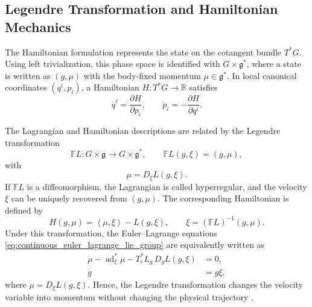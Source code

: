 \subsection{Legendre Transformation and Hamiltonian Mechanics}
\label{sec:continuous_legendre_hamiltonian_mechanics}

The Hamiltonian formulation represents the state on the cotangent bundle $T^*G$. Using left trivialization, this phase space is identified with $G\times\mathfrak g^*$, where a state is written as $(g,\mu)$ with the body-fixed momentum $\mu\in\mathfrak g^*$. In local canonical coordinates $(q^i,p_i)$, a Hamiltonian $H:T^*G\rightarrow\mathbb R$ satisfies
\begin{equation}
    \dot q^i=\frac{\partial H}{\partial p_i},
    \qquad
    \dot p_i=-\frac{\partial H}{\partial q^i}.
    \label{eq:canonical_hamilton_equations}
\end{equation}

The Lagrangian and Hamiltonian descriptions are related by the Legendre transformation
\begin{equation}
    \mathbb{F}L:G\times\mathfrak g\rightarrow G\times\mathfrak g^*,
    \qquad
    \mathbb{F}L(g,\xi)=(g,\mu),
    \label{eq:continuous_legendre_transformation}
\end{equation}
with
\begin{equation}
    \mu=D_{\xi}L(g,\xi).
    \label{eq:continuous_generalized_momentum}
\end{equation}
If $\mathbb{F}L$ is a diffeomorphism, the Lagrangian is called hyperregular, and the velocity $\xi$ can be uniquely recovered from $(g,\mu)$. The corresponding Hamiltonian is defined by
\begin{equation}
    H(g,\mu)
    =
    \left\langle\mu,\xi\right\rangle-L(g,\xi),
    \qquad
    \xi=(\mathbb{F}L)^{-1}(g,\mu).
    \label{eq:continuous_hamiltonian_legendre}
\end{equation}
Under this transformation, the Euler--Lagrange equations \eqref{eq:continuous_euler_lagrange_lie_group} are equivalently written as
\begin{subequations}
\label{eq:continuous_hamilton_equations_lie_group}
\begin{align}
    \dot\mu
    -\operatorname{ad}_{\xi}^*\mu
    -T_e^*L_g\,D_gL(g,\xi)
    &=0,
    \label{eq:continuous_hamilton_momentum_equation}\\
    \dot g&=g\xi,
    \label{eq:continuous_hamilton_reconstruction}
\end{align}
\end{subequations}
where $\mu=D_{\xi}L(g,\xi)$. Hence, the Legendre transformation changes the velocity variable into momentum without changing the physical trajectory \cite{Lee2008}.

